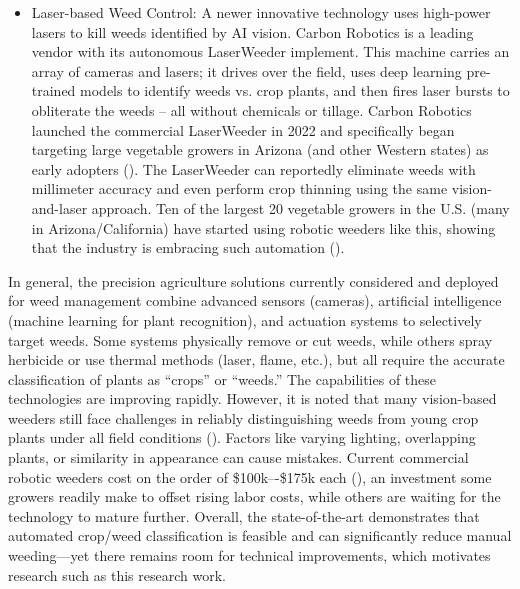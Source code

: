 \documentclass[letterpaper, notitlepage]{report}
\begin{document}
\begin{itemize}
	\item{Laser-based Weed Control: A newer innovative technology uses high-power lasers to kill weeds identified by AI vision. Carbon Robotics is a leading vendor with its autonomous LaserWeeder implement. This machine carries an array of cameras and lasers; it drives over the field, uses deep learning pre-trained models to identify weeds vs. crop plants, and then fires laser bursts to obliterate the weeds – all without chemicals or tillage. Carbon Robotics launched the commercial LaserWeeder in 2022 and specifically began targeting large vegetable growers in Arizona (and other Western states) as early adopters (\cite{It2023-fx}). The LaserWeeder can reportedly eliminate weeds with millimeter accuracy and even perform crop thinning using the same vision-and-laser approach. Ten of the largest 20 vegetable growers in the U.S. (many in Arizona/California) have started using robotic weeders like this, showing that the industry is embracing such automation (\cite{Belton2021-mv}).}

\end{itemize}

In general, the precision agriculture solutions currently  considered and deployed for weed management combine advanced sensors (cameras), artificial intelligence (machine learning for plant recognition), and actuation systems to selectively target weeds. Some systems physically remove or cut weeds, while others spray herbicide or use thermal methods (laser, flame, etc.), but all require the accurate classification of plants as “crops” or “weeds.” The capabilities of these technologies are improving rapidly. However, it is noted that many vision-based weeders still face challenges in reliably distinguishing weeds from young crop plants under all field conditions (\cite{American-Society-of-Agronomy2018-ad}). Factors like varying lighting, overlapping plants, or similarity in appearance can cause mistakes. Current commercial robotic weeders cost on the order of \$100k–-\$175k each (\cite{American-Society-of-Agronomy2018-ad}), an investment some growers readily make to offset rising labor costs, while others are waiting for the technology to mature further. Overall, the state-of-the-art demonstrates that automated crop/weed classification is feasible and can significantly reduce manual weeding—yet there remains room for technical improvements, which motivates research such as this research work.
\end{document}
